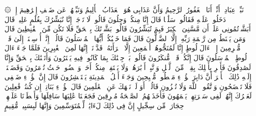 \startbuffer[\q:15:49]
۞ نَبِّئۡ عِبَادِیۤ أَنِّیۤ أَنَا ٱلۡغَفُورُ ٱلرَّحِیمُ%
\stopbuffer
\startbuffer[\q:15:50]
وَأَنَّ عَذَابِی هُوَ ٱلۡعَذَابُ ٱلۡأَلِیمُ%
\stopbuffer
\startbuffer[\q:15:51]
وَنَبِّئۡهُمۡ عَن ضَیۡفِ إِبۡرَٰهِیمَ%
\stopbuffer
\startbuffer[\q:15:52]
إِذۡ دَخَلُوا۟ عَلَیۡهِ فَقَالُوا۟ سَلَٰمࣰا قَالَ إِنَّا مِنكُمۡ وَجِلُونَ%
\stopbuffer
\startbuffer[\q:15:53]
قَالُوا۟ لَا تَوۡجَلۡ إِنَّا نُبَشِّرُكَ بِغُلَٰمٍ عَلِیمࣲ%
\stopbuffer
\startbuffer[\q:15:54]
قَالَ أَبَشَّرۡتُمُونِی عَلَىٰۤ أَن مَّسَّنِیَ ٱلۡكِبَرُ فَبِمَ تُبَشِّرُونَ%
\stopbuffer
\startbuffer[\q:15:55]
قَالُوا۟ بَشَّرۡنَٰكَ بِٱلۡحَقِّ فَلَا تَكُن مِّنَ ٱلۡقَٰنِطِینَ%
\stopbuffer
\startbuffer[\q:15:56]
قَالَ وَمَن یَقۡنَطُ مِن رَّحۡمَةِ رَبِّهِۦۤ إِلَّا ٱلضَّاۤلُّونَ%
\stopbuffer
\startbuffer[\q:15:57]
قَالَ فَمَا خَطۡبُكُمۡ أَیُّهَا ٱلۡمُرۡسَلُونَ%
\stopbuffer
\startbuffer[\q:15:58]
قَالُوۤا۟ إِنَّاۤ أُرۡسِلۡنَاۤ إِلَىٰ قَوۡمࣲ مُّجۡرِمِینَ%
\stopbuffer
\startbuffer[\q:15:59]
إِلَّاۤ ءَالَ لُوطٍ إِنَّا لَمُنَجُّوهُمۡ أَجۡمَعِینَ%
\stopbuffer
\startbuffer[\q:15:60]
إِلَّا ٱمۡرَأَتَهُۥ قَدَّرۡنَاۤ إِنَّهَا لَمِنَ ٱلۡغَٰبِرِینَ%
\stopbuffer
\startbuffer[\q:15:61]
فَلَمَّا جَاۤءَ ءَالَ لُوطٍ ٱلۡمُرۡسَلُونَ%
\stopbuffer
\startbuffer[\q:15:62]
قَالَ إِنَّكُمۡ قَوۡمࣱ مُّنكَرُونَ%
\stopbuffer
\startbuffer[\q:15:63]
قَالُوا۟ بَلۡ جِئۡنَٰكَ بِمَا كَانُوا۟ فِیهِ یَمۡتَرُونَ%
\stopbuffer
\startbuffer[\q:15:64]
وَأَتَیۡنَٰكَ بِٱلۡحَقِّ وَإِنَّا لَصَٰدِقُونَ%
\stopbuffer
\startbuffer[\q:15:65]
فَأَسۡرِ بِأَهۡلِكَ بِقِطۡعࣲ مِّنَ ٱلَّیۡلِ وَٱتَّبِعۡ أَدۡبَٰرَهُمۡ وَلَا یَلۡتَفِتۡ مِنكُمۡ أَحَدࣱ وَٱمۡضُوا۟ حَیۡثُ تُؤۡمَرُونَ%
\stopbuffer
\startbuffer[\q:15:66]
وَقَضَیۡنَاۤ إِلَیۡهِ ذَٰلِكَ ٱلۡأَمۡرَ أَنَّ دَابِرَ هَٰۤؤُلَاۤءِ مَقۡطُوعࣱ مُّصۡبِحِینَ%
\stopbuffer
\startbuffer[\q:15:67]
وَجَاۤءَ أَهۡلُ ٱلۡمَدِینَةِ یَسۡتَبۡشِرُونَ%
\stopbuffer
\startbuffer[\q:15:68]
قَالَ إِنَّ هَٰۤؤُلَاۤءِ ضَیۡفِی فَلَا تَفۡضَحُونِ%
\stopbuffer
\startbuffer[\q:15:69]
وَٱتَّقُوا۟ ٱللَّهَ وَلَا تُخۡزُونِ%
\stopbuffer
\startbuffer[\q:15:70]
قَالُوۤا۟ أَوَ لَمۡ نَنۡهَكَ عَنِ ٱلۡعَٰلَمِینَ%
\stopbuffer
\startbuffer[\q:15:71]
قَالَ هَٰۤؤُلَاۤءِ بَنَاتِیۤ إِن كُنتُمۡ فَٰعِلِینَ%
\stopbuffer
\startbuffer[\q:15:72]
لَعَمۡرُكَ إِنَّهُمۡ لَفِی سَكۡرَتِهِمۡ یَعۡمَهُونَ%
\stopbuffer
\startbuffer[\q:15:73]
فَأَخَذَتۡهُمُ ٱلصَّیۡحَةُ مُشۡرِقِینَ%
\stopbuffer
\startbuffer[\q:15:74]
فَجَعَلۡنَا عَٰلِیَهَا سَافِلَهَا وَأَمۡطَرۡنَا عَلَیۡهِمۡ حِجَارَةࣰ مِّن سِجِّیلٍ%
\stopbuffer
\startbuffer[\q:15:75]
إِنَّ فِی ذَٰلِكَ لَءَایَٰتࣲ لِّلۡمُتَوَسِّمِینَ%
\stopbuffer
\startbuffer[\q:15:76]
وَإِنَّهَا لَبِسَبِیلࣲ مُّقِیمٍ%
\stopbuffer
\startbuffer[\q:15:77]
